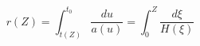\begin{equation}\label{rred}
r(Z)=\int^{t_0}_{t(Z)}\frac{du}{a(u)}=\int^Z_0\frac{d\xi}{H(\xi)}
\end{equation}

